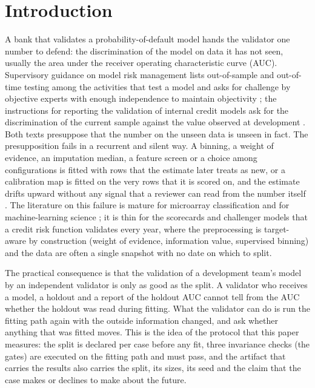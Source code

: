 \section{Introduction}
\label{sec:introduction}

A bank that validates a probability-of-default model hands the validator one number to defend: the discrimination of the model on data it has not seen, usually the area under the receiver operating characteristic curve (AUC). Supervisory guidance on model risk management lists out-of-sample and out-of-time testing among the activities that test a model and asks for challenge by objective experts with enough independence to maintain objectivity \citep{sr262}; the instructions for reporting the validation of internal credit models ask for the discrimination of the current sample against the value observed at development \citep{ecb2019}. Both texts presuppose that the number on the unseen data is unseen in fact. The presupposition fails in a recurrent and silent way. A binning, a weight of evidence, an imputation median, a feature screen or a choice among configurations is fitted with rows that the estimate later treats as new, or a calibration map is fitted on the very rows that it is scored on, and the estimate drifts upward without any signal that a reviewer can read from the number itself \citep{kaufman2012,kapoor2023}. The literature on this failure is mature for microarray classification and for machine-learning science \citep{ambroise2002,varma2006,cawley2010,kapoor2023}; it is thin for the scorecards and challenger models that a credit risk function validates every year, where the preprocessing is target-aware by construction (weight of evidence, information value, supervised binning) and the data are often a single snapshot with no date on which to split.

The practical consequence is that the validation of a development team's model by an independent validator is only as good as the split. A validator who receives a model, a holdout and a report of the holdout AUC cannot tell from the AUC whether the holdout was read during fitting. What the validator can do is run the fitting path again with the outside information changed, and ask whether anything that was fitted moves. This is the idea of the protocol that this paper measures: the split is declared per case before any fit, three invariance checks (the gates) are executed on the fitting path and must pass, and the artifact that carries the results also carries the split, its sizes, its seed and the claim that the case makes or declines to make about the future.

